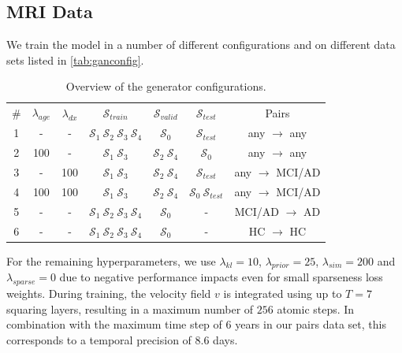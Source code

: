 \subsection{MRI Data}

We train the model in a number of different configurations and on different data sets listed in \autoref{tab:ganconfig}.

\begin{table}[h]
	\begin{center}
		\begin{tabular}{c c c c c c c}
			\toprule
			\# & $\lambda_{age}$ & $\lambda_{dx}$ &
				$\mathcal{S}_{train}$ & $\mathcal{S}_{valid}$ & $\mathcal{S}_{test}$ & Pairs \\
			\cmidrule(lr){1-7}
			1 &  -  &  -  & $\mathcal{S}_1\:\mathcal{S}_2\:\mathcal{S}_3\:\mathcal{S}_4$ &
				      $\mathcal{S}_0$ &
				      $\mathcal{S}_{test}$ &
				      \footnotesize any $\rightarrow$ any \\
			2 & 100 &  -  & $\mathcal{S}_1\:\mathcal{S}_3$ & 
				      $\mathcal{S}_2\:\mathcal{S}_4$ &
				      $\mathcal{S}_0$ & 
				      \footnotesize any $\rightarrow$ any \\
			3 &  -  & 100 & $\mathcal{S}_1\:\mathcal{S}_3$ & 
				      $\mathcal{S}_2\:\mathcal{S}_4$ &
				      $\mathcal{S}_{test}$ & 
				      \footnotesize any $\rightarrow$ MCI/AD \\
			4 & 100 & 100 & $\mathcal{S}_1\:\mathcal{S}_3$ & 
				      $\mathcal{S}_2\:\mathcal{S}_4$ &
				      $\mathcal{S}_0\:\mathcal{S}_{test}$ &
				      \footnotesize any $\rightarrow$ MCI/AD \\
			5 &  -  &  -  & $\mathcal{S}_1\:\mathcal{S}_2\:\mathcal{S}_3\:\mathcal{S}_4$ &
				      $\mathcal{S}_0$ &
				      - &
				      \footnotesize MCI/AD $\rightarrow$ AD \\
			6 &  -  &  -  & $\mathcal{S}_1\:\mathcal{S}_2\:\mathcal{S}_3\:\mathcal{S}_4$ &
				      $\mathcal{S}_0$ &
				      - &
				      \footnotesize HC $\rightarrow$ HC \\
			\bottomrule
		\end{tabular}
		\caption{Overview of the generator configurations.}
		\label{tab:ganconfig}
	\end{center}
\end{table}

For the remaining hyperparameters, we use $\lambda_{kl} = 10$, $\lambda_{prior} = 25$, $\lambda_{sim} = 200$ and $\lambda_{sparse} = 0$ due to negative performance impacts even for small sparseness loss weights. During training, the velocity field $v$ is integrated using up to $T = 7$ squaring layers, resulting in a maximum number of $256$ atomic steps. In combination with the maximum time step of 6 years in our pairs data set, this corresponds to a temporal precision of 8.6 days.

